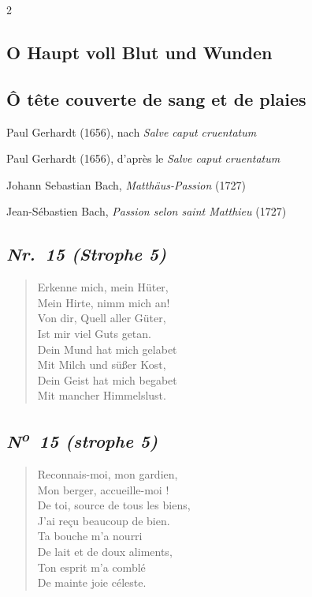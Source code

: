 \documentclass[a4paper,12pt]{article}
\newcommand\chunks[2]{%
\begin{leftcolumn*}\begin{otherlanguage}{german}%
{#1}%
\end{otherlanguage}\end{leftcolumn*}%
\begin{rightcolumn}\begin{otherlanguage}{french}%
{#2}%
\end{otherlanguage}\end{rightcolumn}%
}
\newcommand\strophe[1]{\subsection*{\normalsize\normalfont\itshape #1}}
\begin{document}
\thispagestyle{empty}
\setlength{\columnsep}{8mm}

\begin{paracol}{2}
  \chunks{\section*{O Haupt voll Blut und Wunden}}
         {\section*{Ô tête couverte de sang et de plaies}}

  \chunks{\noindent\raggedright\small Paul Gerhardt (1656), nach \textit{Salve caput cruentatum}}
         {\noindent\raggedright\small Paul Gerhardt (1656), d’après le \textit{Salve caput cruentatum}}

  \chunks{\noindent\raggedright\small Johann Sebastian Bach, \textit{Matthäus-Passion} (1727)}
         {\noindent\raggedright\small Jean-Sébastien Bach, \textit{Passion selon saint Matthieu} (1727)}

  \chunks{\strophe{Nr.~15 (Strophe 5)}
          \begin{verse}
          Erkenne mich, mein Hüter,\\
          Mein Hirte, nimm mich an!\\
          Von dir, Quell aller Güter,\\
          Ist mir viel Guts getan.\\
          Dein Mund hat mich gelabet\\
          Mit Milch und süßer Kost,\\
          Dein Geist hat mich begabet\\
          Mit mancher Himmelslust.
          \end{verse}}
         {\strophe{N\textsuperscript{o}~15 (strophe 5)}
          \begin{verse}
          Reconnais-moi, mon gardien,\\
          Mon berger, accueille-moi !\\
          De toi, source de tous les biens,\\
          J’ai reçu beaucoup de bien.\\
          Ta bouche m’a nourri\\
          De lait et de doux aliments,\\
          Ton esprit m’a comblé\\
          De mainte joie céleste.
          \end{verse}}


\end{paracol}
\end{document}
